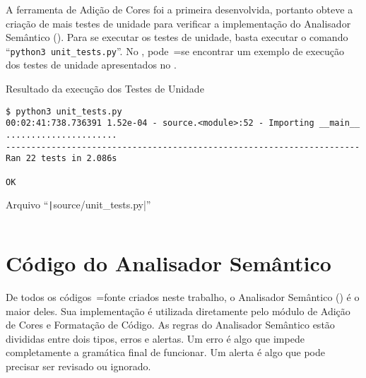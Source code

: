 A ferramenta de Adição de Cores foi a primeira desenvolvida,
portanto obteve a criação de mais testes de unidade para verificar a implementação do Analisador Semântico ().
Para se executar os testes de unidade,
basta executar o comando ``\texttt{python3 unit_tests.py}''.
No ,
pode~=se encontrar um exemplo de execução dos testes de unidade apresentados no .
\begin{code}
\caption{Resultado da execução dos Testes de Unidade}
\label{code:unitTestsResults}
\begin{verbatim}
$ python3 unit_tests.py
00:02:41:738.736391 1.52e-04 - source.<module>:52 - Importing __main__
......................
----------------------------------------------------------------------
Ran 22 tests in 2.086s

OK
\end{verbatim}
\end{code}
\begin{code}
\caption[Arquivo ``source/unit\_tests.py'']{Arquivo ``\texttt|source/unit_tests.py|''}
\label{code:unitTestsPy}
\inputminted[firstline=39,firstnumber=1]{python3}{../source/unit_tests.py}
\end{code}


\chapter[Analisador Semântico]{Código do Analisador Semântico}
\label{chapter:codigoDoAnalisadorSemantico}

De todos os códigos~=fonte criados neste trabalho,
o Analisador Semântico () é o maior deles.
Sua implementação é utilizada diretamente pelo módulo de Adição de Cores e
Formatação de Código.
As regras do Analisador Semântico estão divididas entre dois tipos,
erros e
alertas.
Um erro é algo que impede completamente a gramática final de funcionar.
Um alerta é algo que pode precisar ser revisado ou
ignorado.

